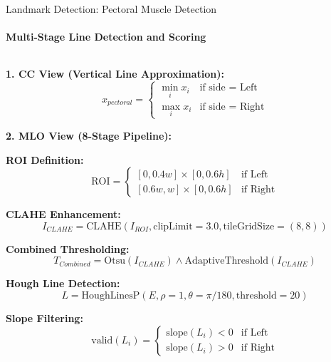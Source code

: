 \documentclass[8pt,aspectratio=169,xcolor=dvipsnames]{beamer}
\begin{document}
\begin{frame}{Landmark Detection: Pectoral Muscle Detection}
    \framesubtitle{Multi-Stage Line Detection and Scoring}
    
    \begin{columns}
        \begin{column}{0.53\textwidth}
            \tiny
            \textbf{1. CC View (Vertical Line Approximation):}
            \begin{equation}
            x_{pectoral} = \begin{cases}
                \min_i x_i & \text{if side = Left} \\
                \max_i x_i & \text{if side = Right}
            \end{cases}
            \end{equation}
            
            \textbf{2. MLO View (8-Stage Pipeline):}
            
            \textbf{ROI Definition:}
            \begin{equation}
            \text{ROI} = \begin{cases}
                [0, 0.4w] \times [0, 0.6h] & \text{if Left} \\
                [0.6w, w] \times [0, 0.6h] & \text{if Right}
            \end{cases}
            \end{equation}
            
            \textbf{CLAHE Enhancement:}
            \begin{equation}
            I_{CLAHE} = \text{CLAHE}(I_{ROI}, \text{clipLimit}=3.0, \text{tileGridSize}=(8,8))
            \end{equation}
            
            \textbf{Combined Thresholding:}
            \begin{equation}
            T_{Combined} = \text{Otsu}(I_{CLAHE}) \land \text{AdaptiveThreshold}(I_{CLAHE})
            \end{equation}
            
            \textbf{Hough Line Detection:}
            \begin{equation}
            L = \text{HoughLinesP}(E, \rho=1, \theta=\pi/180, \text{threshold}=20)
            \end{equation}
            
            \textbf{Slope Filtering:}
            \begin{equation}
            \text{valid}(L_i) = \begin{cases}
                \text{slope}(L_i) < 0 & \text{if Left} \\
                \text{slope}(L_i) > 0 & \text{if Right}
            \end{cases}
            \end{equation}
            

\end{column}
\end{columns}
\end{frame}
\end{document}
